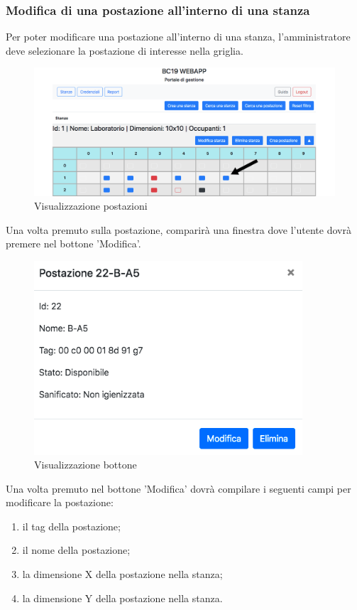 \subsubsection{Modifica di una postazione all'interno di una stanza}
Per poter modificare una postazione all'interno di una stanza, l'amministratore deve selezionare la postazione di interesse nella griglia.
\begin{figure}[H]
	\centering
	\includegraphics[width=15cm]{res/images/postDaEliminare.png}
	\caption{Visualizzazione postazioni}
\end{figure}
Una volta premuto sulla postazione, comparirà una finestra dove l'utente dovrà premere nel bottone 'Modifica'.
\begin{figure}[H]
	\centering
	\includegraphics[width=10cm]{res/images/bottoneCestinoWorkstation.png}
	\caption{Visualizzazione bottone}
\end{figure}
Una volta premuto nel bottone 'Modifica' dovrà compilare i seguenti campi per modificare la postazione:
\begin{enumerate}
	\item il tag della postazione;
	\item il nome della postazione;
	\item la dimensione X della postazione nella stanza;
	\item la dimensione Y della postazione nella stanza.
\end{enumerate}
